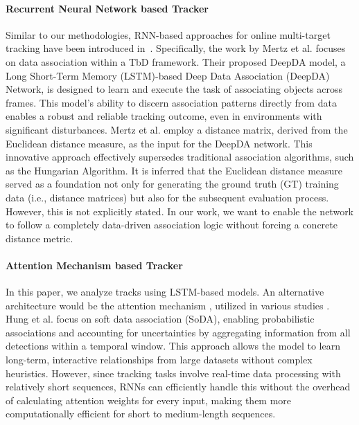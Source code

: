 \documentclass[letterpaper, 10 pt, journal, twoside]{IEEEtran}
\begin{document}
\paragraph{Recurrent Neural Network based Tracker}
Similar to our methodologies, RNN-based approaches for online multi-target tracking have been introduced in~{\cite{DL_RNN_mot.2016,DL_RNN_data_association.2019,DL_RNN_data_association.2020,liu2020deepmtt}}.
Specifically, the work by Mertz et al. {\cite{DL_RNN_data_association.2019}} focuses on data association within a TbD framework.
Their proposed DeepDA model, a Long Short-Term Memory (LSTM)-based Deep Data Association (DeepDA) Network, is designed to learn and execute the task of associating objects across frames.
This model's ability to discern association patterns directly from data enables a robust and reliable tracking outcome, even in environments with significant disturbances.
Mertz et al. employ a distance matrix, derived from the Euclidean distance measure, as the input for the DeepDA network.
This innovative approach effectively supersedes traditional association algorithms, such as the Hungarian Algorithm.
It is inferred that the Euclidean distance measure served as a foundation not only for generating the ground truth (GT) training data (i.e., distance matrices) but also for the subsequent evaluation process.
However, this is not explicitly stated.
In our work, we want to enable the network to follow a completely data-driven association logic without forcing a concrete distance metric.

\paragraph{Attention Mechanism based Tracker}
In this paper, we analyze tracks using \ac{LSTM}-based models.
An alternative architecture would be the attention mechanism {\cite{ML_Attention.2017}}, utilized in various studies {\cite{DL_ATT_mot_sot_based.2017,DL_ATT_CNN_mot_sot_based.2017,DL_ATT_CNN_soda.2020,DL_CNN_ATT_mot.2017,DL_ATT_Trackformer.2022,Carion2020EndtoEndOD}}.
Hung et al. {\cite{DL_ATT_CNN_soda.2020}} focus on soft data association (SoDA), enabling probabilistic associations and accounting for uncertainties by aggregating information from all detections within a temporal window.
This approach allows the model to learn long-term, interactive relationships from large datasets without complex heuristics.
However, since tracking tasks involve real-time data processing with relatively short sequences, \acp{RNN} can efficiently handle this without the overhead of calculating attention weights for every input, making them more computationally efficient for short to medium-length sequences.
\end{document}
